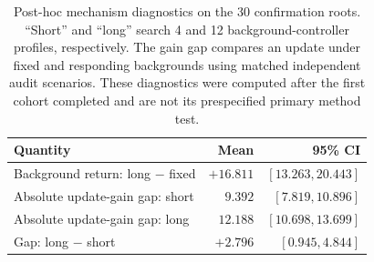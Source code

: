 \begin{table}[t]
\centering
\small
\caption{Post-hoc mechanism diagnostics on the 30 confirmation roots. ``Short'' and ``long'' search 4 and 12 background-controller profiles, respectively. The gain gap compares an update under fixed and responding backgrounds using matched independent audit scenarios. These diagnostics were computed after the first cohort completed and are not its prespecified primary method test.}
\label{add20260923:metadrive:mechanism}
\begin{tabular}{lrr}
\hline
Quantity & Mean & 95\% CI \\
\hline
Background return: long $-$ fixed & $+16.811$ & $[13.263,20.443]$ \\
Absolute update-gain gap: short & $9.392$ & $[7.819,10.896]$ \\
Absolute update-gain gap: long & $12.188$ & $[10.698,13.699]$ \\
Gap: long $-$ short & $+2.796$ & $[0.945,4.844]$ \\
\hline
\end{tabular}
\end{table}
